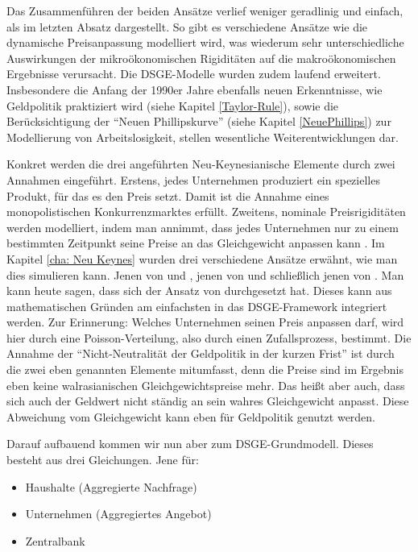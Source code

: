 Das Zusammenführen der beiden Ansätze verlief weniger geradlinig und einfach, als im letzten Absatz dargestellt. So gibt es verschiedene Ansätze \parencite[S. 310]{Romer2019} wie die dynamische Preisanpassung modelliert wird, was wiederum sehr unterschiedliche Auswirkungen der mikroökonomischen Rigiditäten auf die makroökonomischen Ergebnisse verursacht. Die DSGE-Modelle wurden zudem laufend erweitert. Insbesondere die Anfang der 1990er Jahre ebenfalls neuen Erkenntnisse, wie Geldpolitik praktiziert wird (siehe Kapitel \ref{Taylor-Rule}), sowie die Berücksichtigung der "`Neuen Phillipskurve"' (siehe Kapitel \ref{NeuePhillips}) zur Modellierung von Arbeitslosigkeit, stellen wesentliche Weiterentwicklungen dar.   

Konkret werden die drei angeführten Neu-Keynesianische Elemente durch zwei Annahmen eingeführt. Erstens, jedes Unternehmen produziert ein spezielles Produkt, für das es den Preis setzt. Damit ist die Annahme eines monopolistischen Konkurrenzmarktes erfüllt. Zweitens, nominale Preisrigiditäten werden modelliert, indem man annimmt, dass jedes Unternehmen nur zu einem bestimmten Zeitpunkt seine Preise an das Gleichgewicht anpassen kann \parencite[S. 52]{Gali2015}. Im Kapitel \ref{cha: Neu Keynes} wurden drei verschiedene Ansätze erwähnt, wie man dies simulieren kann. Jenen von \textcite{Fischer1977} und \textcite{Taylor1977}, jenen von \textcite{Taylor1979} und schließlich jenen von \textcite{Calvo1983}. Man kann heute sagen, dass sich der Ansatz von \textcite{Calvo1983} durchgesetzt hat. Dieses kann aus mathematischen Gründen am einfachsten in das DSGE-Framework integriert werden. Zur Erinnerung: Welches Unternehmen seinen Preis anpassen darf, wird hier durch eine Poisson-Verteilung, also durch einen Zufallsprozess, bestimmt. Die Annahme der "`Nicht-Neutralität der Geldpolitik in der kurzen Frist"' ist durch die zwei eben genannten Elemente mitumfasst, denn die Preise sind im Ergebnis eben keine walrasianischen Gleichgewichtspreise mehr. Das heißt aber auch, dass sich auch der Geldwert nicht ständig an sein wahres Gleichgewicht anpasst. Diese Abweichung vom Gleichgewicht kann eben für Geldpolitik genutzt werden.

Darauf aufbauend kommen wir nun aber zum DSGE-Grundmodell. Dieses besteht aus drei Gleichungen. Jene für:
\begin{itemize}
	\item Haushalte (Aggregierte Nachfrage)
	\item Unternehmen (Aggregiertes Angebot)
	\item Zentralbank
\end{itemize}

